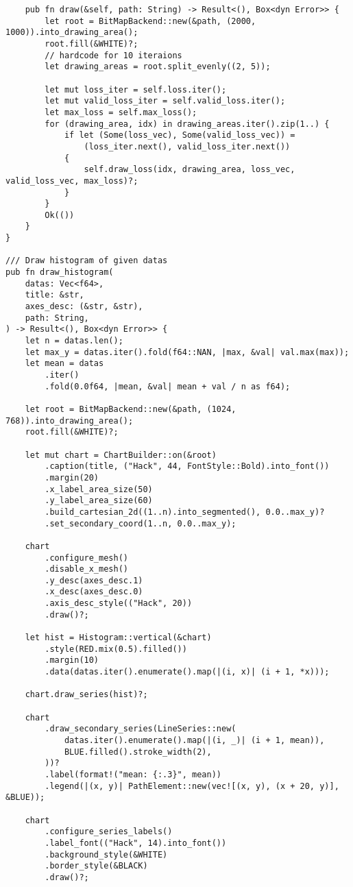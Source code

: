\begin{verbatim}
    pub fn draw(&self, path: String) -> Result<(), Box<dyn Error>> {
        let root = BitMapBackend::new(&path, (2000, 1000)).into_drawing_area();
        root.fill(&WHITE)?;
        // hardcode for 10 iteraions
        let drawing_areas = root.split_evenly((2, 5));

        let mut loss_iter = self.loss.iter();
        let mut valid_loss_iter = self.valid_loss.iter();
        let max_loss = self.max_loss();
        for (drawing_area, idx) in drawing_areas.iter().zip(1..) {
            if let (Some(loss_vec), Some(valid_loss_vec)) =
                (loss_iter.next(), valid_loss_iter.next())
            {
                self.draw_loss(idx, drawing_area, loss_vec, valid_loss_vec, max_loss)?;
            }
        }
        Ok(())
    }
}

/// Draw histogram of given datas
pub fn draw_histogram(
    datas: Vec<f64>,
    title: &str,
    axes_desc: (&str, &str),
    path: String,
) -> Result<(), Box<dyn Error>> {
    let n = datas.len();
    let max_y = datas.iter().fold(f64::NAN, |max, &val| val.max(max));
    let mean = datas
        .iter()
        .fold(0.0f64, |mean, &val| mean + val / n as f64);

    let root = BitMapBackend::new(&path, (1024, 768)).into_drawing_area();
    root.fill(&WHITE)?;

    let mut chart = ChartBuilder::on(&root)
        .caption(title, ("Hack", 44, FontStyle::Bold).into_font())
        .margin(20)
        .x_label_area_size(50)
        .y_label_area_size(60)
        .build_cartesian_2d((1..n).into_segmented(), 0.0..max_y)?
        .set_secondary_coord(1..n, 0.0..max_y);

    chart
        .configure_mesh()
        .disable_x_mesh()
        .y_desc(axes_desc.1)
        .x_desc(axes_desc.0)
        .axis_desc_style(("Hack", 20))
        .draw()?;

    let hist = Histogram::vertical(&chart)
        .style(RED.mix(0.5).filled())
        .margin(10)
        .data(datas.iter().enumerate().map(|(i, x)| (i + 1, *x)));

    chart.draw_series(hist)?;

    chart
        .draw_secondary_series(LineSeries::new(
            datas.iter().enumerate().map(|(i, _)| (i + 1, mean)),
            BLUE.filled().stroke_width(2),
        ))?
        .label(format!("mean: {:.3}", mean))
        .legend(|(x, y)| PathElement::new(vec![(x, y), (x + 20, y)], &BLUE));

    chart
        .configure_series_labels()
        .label_font(("Hack", 14).into_font())
        .background_style(&WHITE)
        .border_style(&BLACK)
        .draw()?;


\end{verbatim}
